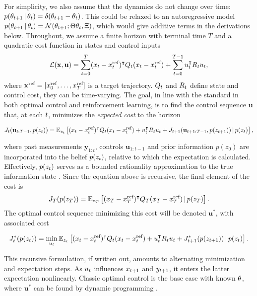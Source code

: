 For simplicity, we also assume that the dynamics do not change over time:
$p(\theta_{t+1}\,|\,\theta_t)=\delta(\theta_{t+1}-\theta_t)$. This could be relaxed to an
autoregressive model $p(\theta_{t+1}\,|\,\theta_t)=\mathcal{N}(\theta_{t+1};\Theta\theta_t,\Xi)$,
which would give additive terms in the derivations below. Throughout, we assume
a finite horizon with terminal time $T$ and a quadratic cost function in states
and control inputs
\begin{equation}
  \label{eq:cost}
  \cL(\mathbf{x},\mathbf{u}) = \sum_{\tk=0}^{T} (x_\tk - \xref_\tk)\T
  \SC_\tk (x_\tk - \xref_\tk) + \sum_{\tk=0}^{T-1} u_\tk\T \CC_\tk u_\tk
  ,
\end{equation}
where $\mathbf{x}^\text{ref} = [x^\text{ref}_0,\dots,x^\text{ref}_T]$ is a
target trajectory. $Q_t$ and $R_t$
define state and control cost, they can be time-varying. The goal, in line with
the standard in both optimal control and reinforcement learning, is to find the
control sequence $\mathbf{u}$ that, at each $t$, minimizes the \emph{expected
cost} to the horizon
\begin{fullwidth}\vspace{-\baselineskip}
\begin{equation}
  \label{eq:1}
  J_\tk(\mathbf{u}_{\tk:T-1},p(z_\tk)) = \Exp_{z_\tk}\left[ (x_\tk -
  \xref_\tk)\T \SC_\tk
  (x_\tk - \xref_\tk) + u_\tk\T \CC_\tk u_\tk +
  J_{\tk+1}(\mathbf{u}_{\tk+1:T-1},p(z_{\tk+1}))\g p(z_\tk)\right],
\end{equation}
\end{fullwidth}
where past measurements $\mathbf{y}_{1:t}$, controls $\mathbf{u}_{1:t-1}$ and
prior information $p(z_0)$ are incorporated into the belief $p(z_t)$, relative
to which the expectation is calculated. Effectively, $p(z_t)$ serves as a
bounded rationality approximation to the true information state
\cite[]{Kumar.Varaiya:1986:Stochastic}. Since the equation above is
recursive, the final element of the cost is
\begin{equation}
    J_{T}(p(z_T)) = \mathbb{E}_{z_{T}}\left[ (x_T -x^\text{ref} _T)^{\intercal} Q_T (x_T -
    x^\text{ref}_T) \,|\, p(z_T) \right].
\end{equation}
The optimal control sequence
minimizing this cost will be denoted $\mathbf{u}^*$, with associated cost
\begin{fullwidth}\vspace{-\baselineskip}
\begin{equation}
  \label{eq:optimal-cost}
  J^*_\tk(p(z_\tk)) = \min_{u_\tk}\Exp_{z_\tk}\left[ (x_\tk -
\xref_\tk)\T \SC_\tk
(x_\tk - \xref_\tk) +
    u_\tk\T \CC_\tk u_\tk + J_{\tk+1} ^*(p(z_{\tk+1}))\g p(z_\tk) \right].
\end{equation}
\end{fullwidth}
This recursive formulation, if written out, amounts to alternating minimization
and expectation steps. As $u_t$ influences $x_{t+1}$ and $y_{t+1}$, it
enters the latter expectation nonlinearly. Classic optimal control is the base
case with known $\theta$, where $\mathbf{u}^*$ can be found by dynamic programming
%
%
.

